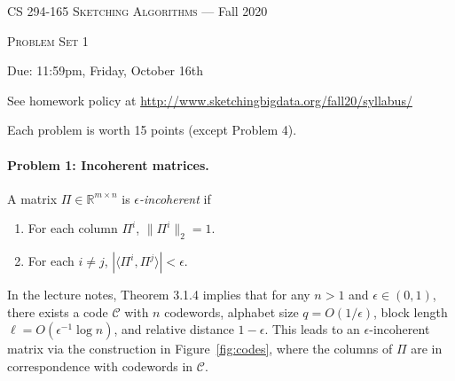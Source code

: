\documentclass[12pt]{article}
\newcommand{\R}{\mathbb{R}}
\newcommand{\inprod}[1]{\langle #1 \rangle}
\begin{document}
\thispagestyle{empty}

\begin{center}
{\Large \textsc{CS 294-165 Sketching Algorithms} --- Fall 2020}

\bigskip

{\Large \textsc{Problem Set 1}}

\smallskip

Due: 11:59pm, Friday, October 16th

\bigskip

{\footnotesize See homework policy at \url{http://www.sketchingbigdata.org/fall20/syllabus/}}

{\footnotesize Each problem is worth 15 points (except Problem 4).}
\end{center}

\paragraph{Problem 1: Incoherent matrices.} A matrix $\Pi\in\R^{m\times n}$ is {\em $\epsilon$-incoherent} if
\begin{enumerate}
  \item For each column $\Pi^i$,  $\|\Pi^i\|_2 = 1$.
\item For each $i\neq j$, $|\inprod{\Pi^i, \Pi^j}| < \epsilon$.
  \end{enumerate}

  In the lecture notes, Theorem 3.1.4 implies that for any $n> 1$ and $\epsilon\in(0,1)$, there exists a code $\mathcal C$ with $n$ codewords, alphabet size $q=O(1/\epsilon)$, block length $\ell = O(\epsilon^{-1}\log n)$, and relative distance $1-\epsilon$. This leads to an $\epsilon$-incoherent matrix via the construction in Figure~\ref{fig:codes}, where the columns of $\Pi$ are in correspondence with codewords in $\mathcal C$.
\end{document}
